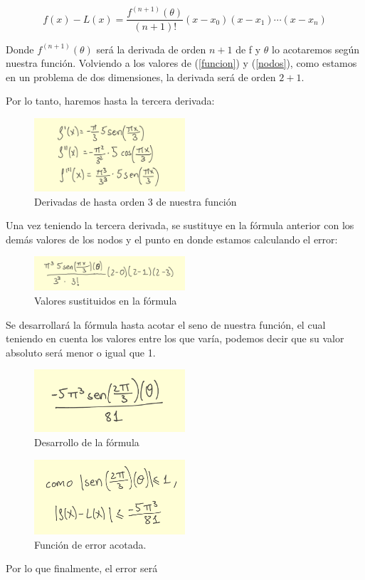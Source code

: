 \documentclass{article}
\begin{document}
\begin{equation}
	f(x) - L(x) = \frac{f^{(n+1)}(\theta)}{(n+1)!}(x - x_0)(x - x_1)\cdots(x - x_n)
\end{equation}

Donde $f^{(n+1)}(\theta)$ será la derivada de orden $n+1$ de f y $\theta$ lo acotaremos según nuestra función.
Volviendo a los valores de (\ref{funcion}) y (\ref{nodos}), como estamos en un problema de dos dimensiones, la derivada será de orden $2+1$.

Por lo tanto, haremos hasta la tercera derivada:

\begin{figure}[h]
	\center
	\includegraphics[width=0.5\textwidth]{src/derivadas.png}
	\caption{Derivadas de hasta orden 3 de nuestra función}
\end{figure}

Una vez teniendo la tercera derivada, se sustituye en la fórmula anterior con los demás valores de los nodos y el punto en donde estamos calculando el error:


\begin{figure}[h]
	\center
	\includegraphics[width=0.5\textwidth]{src/eq2.png}
	\caption{Valores sustituidos en la fórmula}
\end{figure}

\newpage

Se desarrollará la fórmula hasta acotar el seno de nuestra función, el cual teniendo en cuenta los valores entre los que varía, podemos decir que su valor absoluto será menor o igual que 1.

\begin{figure}[h]
	\center
	\includegraphics[width=0.5\textwidth]{src/eq3.png}
	\caption{Desarrollo de la fórmula}
\end{figure}

\begin{figure}[h]
	\center
	\includegraphics[width=0.5\textwidth]{src/eq4.png}
	\caption{Función de error acotada.}
\end{figure}

Por lo que finalmente, el error será
\end{document}
